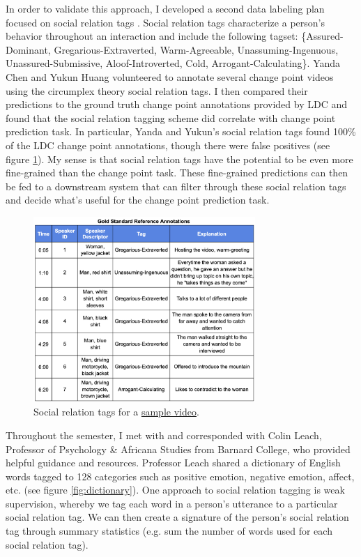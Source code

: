 \documentclass[12pt]{article}
\begin{document}
In order to validate this approach, I developed a second data labeling plan focused on social relation tags \cite{Morrill_2022b}. Social relation tags characterize a person's behavior throughout an interaction and include the following tagset: \{Assured-Dominant, Gregarious-Extraverted, Warm-Agreeable, Unassuming-Ingenuous, Unassured-Submissive, Aloof-Introverted, Cold, Arrogant-Calculating\}. Yanda Chen and Yukun Huang volunteered to annotate several change point videos using the circumplex theory social relation tags. I then compared their predictions to the ground truth change point annotations provided by LDC and found that the social relation tagging scheme did correlate with change point prediction task. In particular, Yanda and Yukun's social relation tags found 100\% of the LDC change point annotations, though there were false positives (see figure \ref{fig:social_relation}). My sense is that social relation tags have the potential to be even more fine-grained than the change point task. These fine-grained predictions can then be fed to a downstream system that can filter through these social relation tags and decide what's useful for the change point prediction task.

\begin{figure}[H]
    \centering
    \includegraphics[width=0.75\textwidth]{social_relation_tags.png}
    \caption{Social relation tags for a \href{http://vd2.bdstatic.com/mda-ncqdcucf3m6zgjzz/360p/h264_delogo/1648202114325469972/mda-ncqdcucf3m6zgjzz.mp4}{sample video}.}
    \label{fig:social_relation}
\end{figure}

Throughout the semester, I met with and corresponded with Colin Leach, Professor of Psychology \& Africana Studies from Barnard College, who provided helpful guidance and resources. Professor Leach shared a dictionary of English words tagged to 128 categories such as positive emotion, negative emotion, affect, etc. (see figure \ref{fig:dictionary}). One approach to social relation tagging is weak supervision, whereby we tag each word in a person's utterance to a particular social relation tag. We can then create a signature of the person's social relation tag through summary statistics (e.g. sum the number of words used for each social relation tag).  
\end{document}

